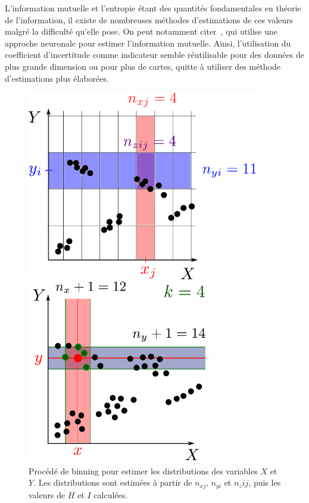 L'information mutuelle et l'entropie étant des quantités fondamentales en théorie de l'information, il existe de nombreuses méthodes d'estimations de ces valeurs malgré la difficulté qu'elle pose. On peut notamment citer~\cite{Belghazi2018MutualIN}, qui utilise une approche neuronale pour estimer l'information mutuelle. Ainsi, l'utilisation du coefficient d'incertitude comme indicateur semble réutilisable pour des données de plus grande dimension ou pour plus de cartes, quitte à utiliser des méthode d'estimations plus élaborées. 

\begin{figure}
\begin{minipage}{0.45\textwidth}
\centering
\includegraphics[width=0.9\textwidth]{boxes}
\caption{Procédé de binning pour estimer les distributions des variables $X$ et $Y$. Les distributions sont estimées à partir de $n_{xj}$, $n_{yi}$ et $n_z{ij}$, puis les valeurs de $H$ et $I$ calculées.}
\label{fig:binning} 
\end{minipage}
\hfill
\begin{minipage}{0.45\textwidth}
\centering
\includegraphics[width=0.7\textwidth]{kraskov.pdf}

\end{minipage}
\end{figure}
